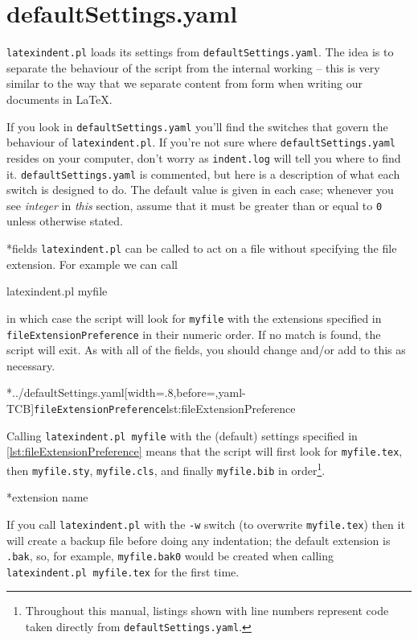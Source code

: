 \section{defaultSettings.yaml}\label{sec:defuseloc}
 \texttt{latexindent.pl} loads its settings from \texttt{defaultSettings.yaml}. The idea is to
 separate the behaviour of the script from the internal working -- this is very similar to
 the way that we separate content from form when writing our documents in \LaTeX.

 If you look in \texttt{defaultSettings.yaml} you'll find the switches that govern the behaviour
 of \texttt{latexindent.pl}. If you're not sure where \texttt{defaultSettings.yaml} resides on
 your computer, don't worry as \texttt{indent.log} will tell you where to find it.
 \texttt{defaultSettings.yaml} is commented, but here is a description of what each switch is
 designed to do. The default value is given in each case; whenever you see
 \emph{integer} in \emph{this} section, assume that it must be
 greater than or equal to \texttt{0} unless otherwise stated.

*{fields}
	\texttt{latexindent.pl} can be called to
	act on a file without specifying the file extension.  For example we can call
	\begin{commandshell}
latexindent.pl myfile
\end{commandshell}
	in which case the script will look for \texttt{myfile} with the extensions
	specified in \texttt{fileExtensionPreference} in their numeric order. If no match is found, the
	script will exit. As with all of the fields, you should change and/or add to this as
	necessary.

	\cmhlistingsfromfile[style=fileExtensionPreference]*{../defaultSettings.yaml}[width=.8\linewidth,before=\centering,yaml-TCB]{\texttt{fileExtensionPreference}}{lst:fileExtensionPreference}

	Calling \texttt{latexindent.pl myfile} with the (default) settings specified in
	\cref{lst:fileExtensionPreference} means that the script will first look for
	\texttt{myfile.tex}, then \texttt{myfile.sty}, \texttt{myfile.cls}, and
	finally \texttt{myfile.bib} in order\footnote{Throughout this manual, listings shown with line numbers represent code
		taken directly from \texttt{defaultSettings.yaml}.}.

*{extension name}

	If you call \texttt{latexindent.pl} with the \texttt{-w} switch (to overwrite
	\texttt{myfile.tex}) then it will create a backup file before doing any indentation;
	the default extension is \texttt{.bak}, so, for example,
	\texttt{myfile.bak0} would be created when calling \texttt{latexindent.pl myfile.tex} for the
	first time.

